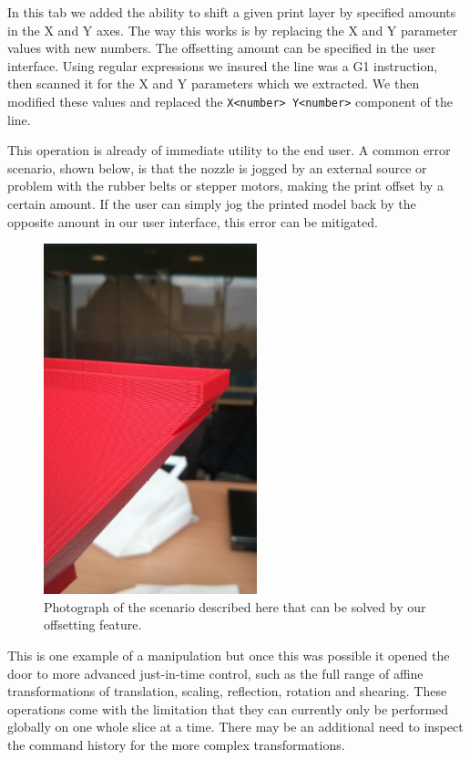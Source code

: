 \documentclass[11pt]{report} %
\begin{document}
In this tab we added the ability to shift a given print layer by specified amounts in the X and Y axes. The way this works is by replacing the X and Y parameter values with new numbers. The offsetting amount can be specified in the user interface. Using regular expressions we insured the line was a G1 instruction, then scanned it for the X and Y parameters which we extracted. We then modified these values and replaced the \verb|X<number> Y<number>| component of the line.

This operation is already of immediate utility to the end user. A common error scenario, shown below, is that the nozzle is jogged by an external source or problem with the rubber belts or stepper motors, making the print offset by a certain amount. If the user can simply jog the printed model back by the opposite amount in our user interface, this error can be mitigated.

\begin{figure}[H]
  \centering
  \includegraphics[height=4in]{FoggerOffset.png}
  \caption{Photograph of the scenario described here that can be solved by our offsetting feature.}
  \label{figure:FoggerOffset}
\end{figure}

This is one example of a manipulation but once this was possible it opened the door to more advanced just-in-time control, such as the full range of affine transformations of translation, scaling, reflection, rotation and shearing. These operations come with the limitation that they can currently only be performed globally on one whole slice at a time. There may be an additional need to inspect the command history for the more complex transformations.
\end{document}
